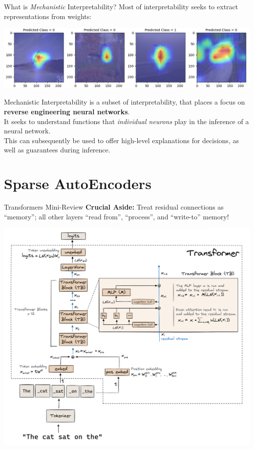 \documentclass{beamer}
\begin{document}
\begin{frame}{What is \textit{Mechanistic} Interpretability?}
	Most of interpretability seeks to extract representations from weights:
	
	\begin{center}
		\includegraphics[width=\textwidth]{img/cams}
	\end{center} \pause

	Mechanistic Interpretability is a subset of interpretability, that places a focus on \textbf{reverse engineering neural networks}. \pause \newline \\

	It seeks to understand functions that \textit{individual neurons} play in the inference of a neural network. \pause \newline \\
	
	This can subsequently be used to offer high-level explanations for decisions, as well as guarantees during inference.
\end{frame}

\section{Sparse AutoEncoders}
\begin{frame}{Transformers Mini-Review}
	\textbf{Crucial Aside:} Treat residual connections as ``memory''; all other layers ``read from'', ``process'', and ``write-to'' memory! \pause
	\begin{center}
		\includegraphics[width=.65\textwidth]{img/transformer.png}
	\end{center}
\end{frame}
\end{document}
